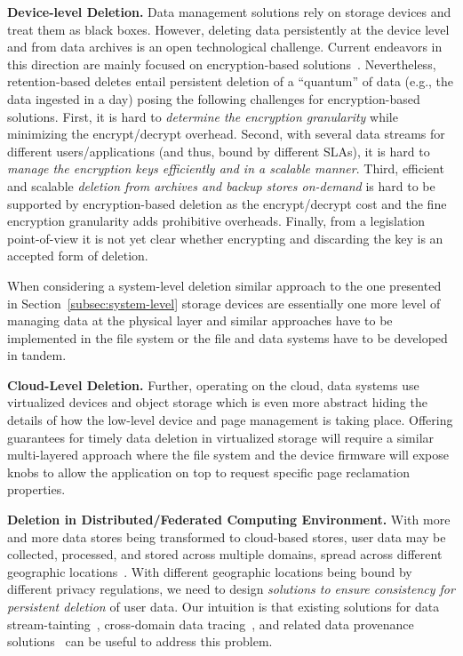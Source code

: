 \documentclass[11pt,dvipdfmx]{article}
\newcommand\Paragraph[1]{\vspace{0.02in}  \noindent \textbf{#1.}}
\begin{document}
\Paragraph{Device-level Deletion}
Data management solutions rely on storage devices and treat them as black boxes.
However, deleting data persistently at the device level and from data archives is an open 
technological challenge. Current endeavors in this direction are mainly focused on 
encryption-based solutions~\cite{Kissel2014,Koppel2013,Li2019a}.
Nevertheless, retention-based deletes entail persistent deletion of a ``quantum'' of data 
(e.g., the data ingested in a day) posing the following challenges for 
encryption-based solutions.
First, it is hard to \textit{determine the encryption granularity} while minimizing 
the encrypt/decrypt overhead. Second, with several data streams for different users/applications (and thus, bound by different SLAs), 
it is hard to \textit{manage the encryption keys efficiently and in a scalable manner}.
Third, efficient and scalable \textit{deletion from archives and backup stores on-demand} is hard to be supported by encryption-based deletion as the encrypt/decrypt cost and the fine encryption granularity adds prohibitive overheads.
Finally, from a legislation point-of-view it is not yet clear whether encrypting
and discarding the key is an accepted form of deletion.

When considering a system-level deletion similar approach to the one presented in 
Section~\ref{subsec:system-level} storage devices are essentially one more level of 
managing data at the physical layer and similar approaches have to be implemented
in the file system or the file and data systems have to be developed in tandem.

\Paragraph{Cloud-Level Deletion}
Further, operating on the cloud, data systems use virtualized devices and
object storage which is even more abstract hiding the details of how the 
low-level device and page management is taking place. Offering guarantees for
timely data deletion in virtualized storage will require a similar multi-layered
approach where the file system and the device firmware will expose knobs to allow
the application on top to request specific page reclamation properties. 





\Paragraph{Deletion in Distributed/Federated Computing Environment} 
With more and more data stores being transformed to cloud-based stores, user data 
may be collected, processed, and stored across multiple domains, spread across 
different geographic locations~\cite{Sarkar2018}. 
With different geographic locations being bound by different privacy regulations, we 
need to design \textit{solutions to ensure consistency for persistent deletion} of 
user data. 
Our intuition is that existing solutions for data stream-tainting~\cite{Enck2010}, 
cross-domain data tracing~\cite{Demsky2011,Herbster2016}, and related data 
provenance solutions~\cite{Buneman2018,Hasan2019} can be useful to address this 
problem.
\end{document}
